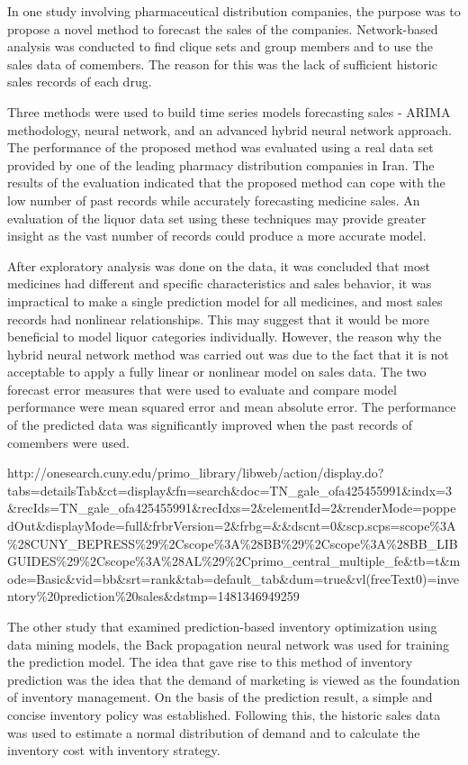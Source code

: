 \documentclass[]{elsarticle} %
\begin{document}
In one study involving pharmaceutical distribution companies, the
purpose was to propose a novel method to forecast the sales of the
companies. Network-based analysis was conducted to find clique sets and
group members and to use the sales data of comembers. The reason for
this was the lack of sufficient historic sales records of each drug.

Three methods were used to build time series models forecasting sales -
ARIMA methodology, neural network, and an advanced hybrid neural network
approach. The performance of the proposed method was evaluated using a
real data set provided by one of the leading pharmacy distribution
companies in Iran. The results of the evaluation indicated that the
proposed method can cope with the low number of past records while
accurately forecasting medicine sales. An evaluation of the liquor data
set using these techniques may provide greater insight as the vast
number of records could produce a more accurate model.

After exploratory analysis was done on the data, it was concluded that
most medicines had different and specific characteristics and sales
behavior, it was impractical to make a single prediction model for all
medicines, and most sales records had nonlinear relationships. This may
suggest that it would be more beneficial to model liquor categories
individually. However, the reason why the hybrid neural network method
was carried out was due to the fact that it is not acceptable to apply a
fully linear or nonlinear model on sales data. The two forecast error
measures that were used to evaluate and compare model performance were
mean squared error and mean absolute error. The performance of the
predicted data was significantly improved when the past records of
comembers were used.

http://onesearch.cuny.edu/primo\_library/libweb/action/display.do?tabs=detailsTab\&ct=display\&fn=search\&doc=TN\_gale\_ofa425455991\&indx=3\&recIds=TN\_gale\_ofa425455991\&recIdxs=2\&elementId=2\&renderMode=poppedOut\&displayMode=full\&frbrVersion=2\&frbg=\&\&dscnt=0\&scp.scps=scope\%3A\%28CUNY\_BEPRESS\%29\%2Cscope\%3A\%28BB\%29\%2Cscope\%3A\%28BB\_LIBGUIDES\%29\%2Cscope\%3A\%28AL\%29\%2Cprimo\_central\_multiple\_fe\&tb=t\&mode=Basic\&vid=bb\&srt=rank\&tab=default\_tab\&dum=true\&vl(freeText0)=inventory\%20prediction\%20sales\&dstmp=1481346949259

The other study that examined prediction-based inventory optimization
using data mining models, the Back propagation neural network was used
for training the prediction model. The idea that gave rise to this
method of inventory prediction was the idea that the demand of marketing
is viewed as the foundation of inventory management. On the basis of the
prediction result, a simple and concise inventory policy was
established. Following this, the historic sales data was used to
estimate a normal distribution of demand and to calculate the inventory
cost with inventory strategy.
\end{document}

